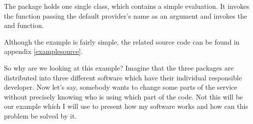 The  package holds one single  class, which contains a
simple evaluation. It invokes the  function passing
the default provider's name as an argument and invokes the  and
 function.

Although the example is fairly simple, the related source code can be found in
appendix \autoref{examplesource}.

So why are we looking at this example? Imagine that the three packages are
distributed into three different software which have their individual
responsible developer. Now let's say, somebody wants to change some parts of the
service without precisely knowing who is using which part of the code. Not this
will be our example which I will use to present how my software works and how
can this problem be solved by it. 




